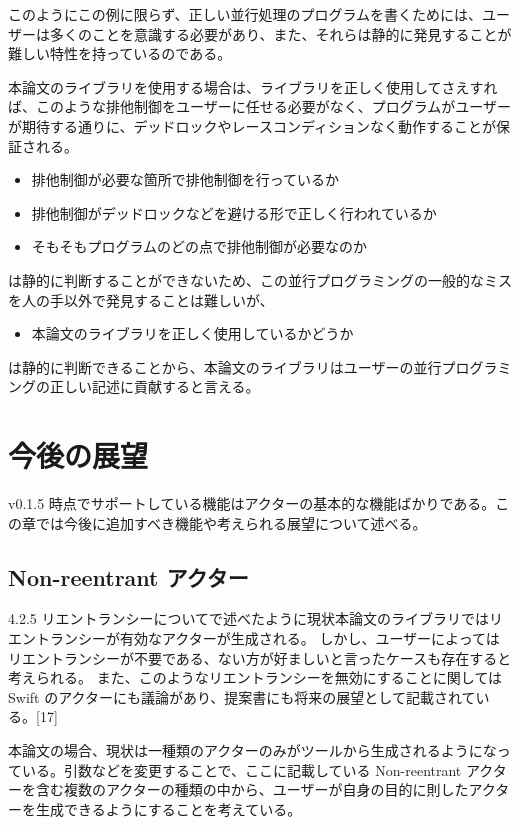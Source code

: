 このようにこの例に限らず、正しい並行処理のプログラムを書くためには、ユーザーは多くのことを意識する必要があり、また、それらは静的に発見することが難しい特性を持っているのである。

本論文のライブラリを使用する場合は、ライブラリを正しく使用してさえすれば、このような排他制御をユーザーに任せる必要がなく、プログラムがユーザーが期待する通りに、デッドロックやレースコンディションなく動作することが保証される。

\begin{itemize}
\item
  排他制御が必要な箇所で排他制御を行っているか
\item
  排他制御がデッドロックなどを避ける形で正しく行われているか
\item
  そもそもプログラムのどの点で排他制御が必要なのか
\end{itemize}

は静的に判断することができないため、この並行プログラミングの一般的なミスを人の手以外で発見することは難しいが、

\begin{itemize}
\item
  本論文のライブラリを正しく使用しているかどうか
\end{itemize}

は静的に判断できることから、本論文のライブラリはユーザーの並行プログラミングの正しい記述に貢献すると言える。

\section{今後の展望}

v0.1.5
時点でサポートしている機能はアクターの基本的な機能ばかりである。この章では今後に追加すべき機能や考えられる展望について述べる。

\subsection{Non-reentrant アクター}

4.2.5
リエントランシーについてで述べたように現状本論文のライブラリではリエントランシーが有効なアクターが生成される。
しかし、ユーザーによってはリエントランシーが不要である、ない方が好ましいと言ったケースも存在すると考えられる。
また、このようなリエントランシーを無効にすることに関しては Swift
のアクターにも議論があり、提案書にも将来の展望として記載されている。{[}17{]}

本論文の場合、現状は一種類のアクターのみがツールから生成されるようになっている。引数などを変更することで、ここに記載している
Non-reentrant
アクターを含む複数のアクターの種類の中から、ユーザーが自身の目的に則したアクターを生成できるようにすることを考えている。

